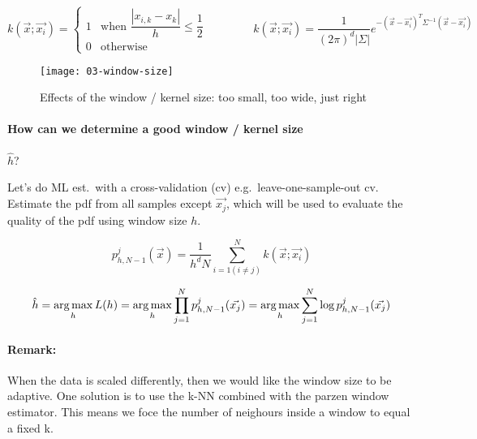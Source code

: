 \begin{equation*}
  k(\vec{x}; \vec{x_i}) = \begin{cases}
    1 &\text{when } \dfrac{|x_{i,k} - x_k|}{h} \le \dfrac{1}{2}\\
    0 &\text{otherwise}
  \end{cases}
  \qquad \qquad
  k(\vec{x}; \vec{x_i}) = \dfrac{1}{{(2\pi)}^d |\Sigma|} e^{-{(\vec{x} - \vec{x_i})}^T \Sigma^{-1}(\vec{x}-\vec{x_i})}
\end{equation*}

\begin{figure}[H]
  \centering
  \texttt{[image: 03-window-size]}
  \caption{Effects of the window / kernel size: too small, too wide, just right}
\end{figure}

\paragraph{How can we determine a good window / kernel size} $\hat{h}$?

Let's do ML est.\ with a cross-validation (cv) e.g.\ leave-one-sample-out cv. Estimate the pdf from all samples except $\vec{x_j}$, which will be used to evaluate the quality of the pdf using window size $h$.

\begin{equation*}
  p_{h,N-1}^j(\vec{x}) = \dfrac{1}{h^d N} \sum_{i=1 (i \neq j)}^N k(\vec{x}; \vec{x_i})
\end{equation*}

\begin{equation*}
  \hat{h} = \operatorname*{arg\,max}_h L(h) = \operatorname*{arg\,max}_h \prod_{j=1}^N p_{h,N-1}^j(\vec{x_j}) = \operatorname*{arg\,max}_h \sum_{j=1}^N \log p_{h,N-1}^j(\vec{x_j})
\end{equation*}

\paragraph{Remark:}
When the data is scaled differently, then we would like the window size to be adaptive. One solution is to use the k-NN combined with the parzen window estimator. This means we foce the number of neighours inside a window to equal a fixed k.
